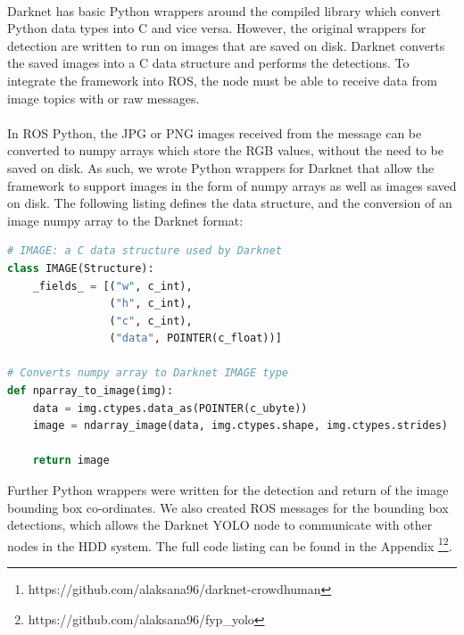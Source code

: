 \paragraph{}Darknet has basic Python wrappers around the compiled library which convert Python data types into C and vice versa. However, the original wrappers for detection are written to run on images that are saved on disk. Darknet converts the saved images into a C data structure  and performs the detections. To integrate the framework into ROS, the node must be able to receive data from image topics with  or raw  messages.

\paragraph{}In ROS Python, the JPG or PNG images received from the  message can be converted to numpy arrays which store the RGB values, without the need to be saved on disk. As such, we wrote Python wrappers for Darknet that allow the framework to support images in the form of numpy arrays as well as images saved on disk. The following listing defines the  data structure, and the conversion of an image numpy array to the Darknet format: \\

\begin{lstlisting}[language=Python, caption={Darknet IMAGE Python wrappers for seamless ROS integration.}]
# IMAGE: a C data structure used by Darknet
class IMAGE(Structure): 
    _fields_ = [("w", c_int),
                ("h", c_int),
                ("c", c_int),
                ("data", POINTER(c_float))]
                
# Converts numpy array to Darknet IMAGE type
def nparray_to_image(img): 
    data = img.ctypes.data_as(POINTER(c_ubyte))
    image = ndarray_image(data, img.ctypes.shape, img.ctypes.strides)

    return image
\end{lstlisting}

Further Python wrappers were written for the detection and return of the image bounding box co-ordinates. We also created ROS messages for the bounding box detections, which allows the Darknet YOLO node to communicate with other nodes in the HDD system. The full code listing can be found in the Appendix \footnote{https://github.com/alaksana96/darknet-crowdhuman}\footnote{https://github.com/alaksana96/fyp\_yolo}.

